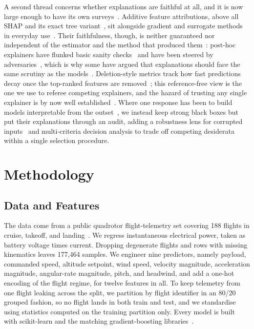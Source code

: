 \documentclass[conference]{IEEEtran}
\begin{document}
A second thread concerns whether explanations are faithful at all, and it is now large enough to have its own surveys~\cite{guidotti2018survey,arrieta2020explainable}. Additive feature attributions, above all SHAP and its exact tree variant~\cite{lundberg2017unified,lundberg2018consistent}, sit alongside gradient and surrogate methods in everyday use~\cite{ribeiro2016why}. Their faithfulness, though, is neither guaranteed nor independent of the estimator and the method that produced them~\cite{jacovi2020towards}: post-hoc explainers have flunked basic sanity checks~\cite{adebayo2018sanity} and have been steered by adversaries~\cite{slack2020fooling}, which is why some have argued that explanations should face the same scrutiny as the models~\cite{doshivelez2017towards}. Deletion-style metrics track how fast predictions decay once the top-ranked features are removed~\cite{hooker2019benchmark}; this reference-free view is the one we use to referee competing explainers, and the hazard of trusting any single explainer is by now well established~\cite{krishna2022disagreement}. Where one response has been to build models interpretable from the outset~\cite{caruana2015intelligible}, we instead keep strong black boxes but put their explanations through an audit, adding a robustness lens for corrupted inputs~\cite{hendrycks2019benchmarking} and multi-criteria decision analysis to trade off competing desiderata~\cite{hwang1981multiple} within a single selection procedure.

\section{Methodology}

\subsection{Data and Features}
The data come from a public quadrotor flight-telemetry set covering 188 flights in cruise, takeoff, and landing~\cite{rodrigues2021drone}. We regress instantaneous electrical power, taken as battery voltage times current. Dropping degenerate flights and rows with missing kinematics leaves 177{,}464 samples. We engineer nine predictors, namely payload, commanded speed, altitude setpoint, wind speed, velocity magnitude, acceleration magnitude, angular-rate magnitude, pitch, and headwind, and add a one-hot encoding of the flight regime, for twelve features in all. To keep telemetry from one flight leaking across the split, we partition by flight identifier in an 80/20 grouped fashion, so no flight lands in both train and test, and we standardise using statistics computed on the training partition only. Every model is built with scikit-learn and the matching gradient-boosting libraries~\cite{pedregosa2011scikit}.
\end{document}
